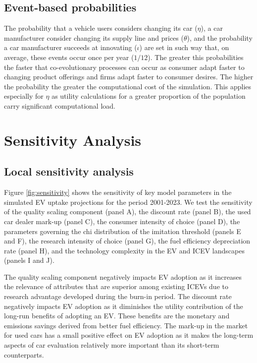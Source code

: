 \documentclass[12pt]{article}
\begin{document}
	\subsection{Event-based probabilities} \label{Callibration_Events} 
	
	The probability that a vehicle users considers changing its car ($\eta$), a car manufacturer consider changing its supply line and prices ($\theta$), and the probability a car manufacturer succeeds at innovating ($\iota$) are set in such way that, on average, these events occur once per year ($1/12$). The greater this probabilities the faster that co-evolutionary processes can occur as consumer adapt faster to changing product offerings and firms adapt faster to consumer desires. The higher the probability the greater the computational cost of the simulation. This applies especially for $\eta$ as utility calculations for a greater proportion of the population carry significant computational load.
	
	\section{Sensitivity Analysis} \label{Calibration_Sensitivity}
	\subsection{Local sensitivity analysis}
	Figure \ref{fig:sensitivity} shows the sensitivity of key model parameters in the simulated EV uptake projections for the period 2001-2023. We test the sensitivity of the quality scaling component (panel A), the discount rate (panel B), the used car dealer mark-up (panel C), the consumer intensity of choice (panel D), the parameters governing the chi distribution of the imitation threshold (panels E and F), the research intensity of choice (panel G), the fuel efficiency depreciation rate (panel H), and the technology complexity in the EV and ICEV landscapes (panels I and J). 
	
	The quality scaling component negatively impacts EV adoption as it increases the relevance of attributes that are superior among existing ICEVs due to research advantage developed during the burn-in period. The discount rate negatively impacts EV adoption as it diminishes the utility contribution of the long-run benefits of adopting an EV. These benefits are the monetary and emissions savings derived from better fuel efficiency. The mark-up in the market for used cars has a small positive effect on EV adoption as it makes the long-term aspects of car evaluation relatively more important than its short-term counterparts.
	
\end{document}
